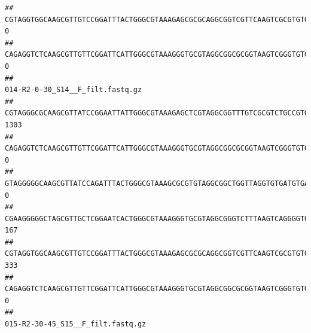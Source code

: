 \documentclass[]{article}
\begin{document}
\begin{verbatim}
## CGTAGGTGGCAAGCGTTGTCCGGATTTACTGGGCGTAAAGAGCGCGCAGGCGGTCGTTCAAGTCGCGTGTGAAAGCCCCCGGCTCAACTGGGGAGGGTCACGCGATACTGATCGACTCGAAGGCAGGAGAGGGTAGTGGAATTCCCGGTGTAGTGGTGAAATGCGTAGATATCGGGAGGAACACCAGTGGCGAAGGCGACTACCTGGCCTGTTCTTGACGCTGAGGCGCGAAAGCTAGGGGAGCAAACG                                 0
## CAGAGGTCTCAAGCGTTGTTCGGATTCATTGGGCGTAAAGGGTGCGTAGGCGGCGCGGTAAGTCGGGTGTGAAATCTCGGGGCTTAACTCCGAAACTGCATTCGATACTGCCGTGCTTGAGGACTGGAGAGGAGACTGGAATTTACGGTGTAGCGGTGAAATGCGTAGATATCGTAAGGAAGACCAGTGGCGAAGGCGGGTCTCTGGACAGTTCCTGACGCTGAGGCACGAAGGCCAGGGGAGCAAACG                                 0
##                                                                                                                                                                                                                                                           014-R2-0-30_S14__F_filt.fastq.gz
## CGTAGGGCGCAAGCGTTATCCGGAATTATTGGGCGTAAAGAGCTCGTAGGCGGTTTGTCGCGTCTGCCGTGAAAGTCCGGGGCTCAACTCCGGATCTGCGGTGGGTACGGGCAGACTAGAGTGATGTAGGGGAGACTGGAATTCCTGGTGTAGCGGTGAAATGCGCAGATATCAGGAGGAACACCGATGGCGAAGGCAGGTCTCTGGGCATTAACTGACGCTGAGGAGCGAAAGCATGGGGAGCGAACA                             1303
## CAGAGGTCTCAAGCGTTGTTCGGATTCATTGGGCGTAAAGGGTGCGTAGGCGGCGCGGTAAGTCGGGTGTGAAATCTCGGAGCTTAACTCCGAAACTGCATTCGATACTGCCGTGCTTGAGGACTGGAGAGGAGACTGGAATTTACGGTGTAGCGGTGAAATGCGTAGATATCGTAAGGAAGACCAGTGGCGAAGGCGGGTCTCTGGACAGTTCCTGACGCTGAGGCACGAAGGCCAGGGGAGCAAACG                                0
## GTAGGGGGCAAGCGTTATCCAGATTTACTGGGCGTAAAGCGCGTGTAGGCGGCTGGTTAGGTGTGATGTGAAATCTTCCGGCTCAACCGGAAAACTGCATTGCAAACCGGCCTGGCTAGAGTGCAGGAGAGGGAAGCGGAATTCCAGGTGTAGCGGTGAAATGCGTAGATATCTGGAGGAACACCAGTGGCGAAGGCGGCTTCCTGGCCTGCAACTGACGCTGAGACGCGAAAGCGTGGGGAGCGAAC                                 0
## CGAAGGGGGCTAGCGTTGCTCGGAATCACTGGGCGTAAAGGGTGCGTAGGCGGGTCTTTAAGTCAGGGGTGAAATCCTGGAGCTCAACTCCAGAACTGCCTTTGATACTGAAGATCTTGAGTTCGGGAGAGGTGAGTGGAACTGCGAGTGTAGAGGTGAAATTCGTAGATATTCGCAAGAACACCAGTGGCGAAGGCGGCTCACTGGCCCGATACTGACGCTGAGGCACGAAAGCGTGGGGAGCAAACA                              167
## CGTAGGTGGCAAGCGTTGTCCGGATTTACTGGGCGTAAAGAGCGCGCAGGCGGTCGTTCAAGTCGCGTGTGAAAGCCCCCGGCTCAACTGGGGAGGGTCACGCGATACTGATCGACTCGAAGGCAGGAGAGGGTAGTGGAATTCCCGGTGTAGTGGTGAAATGCGTAGATATCGGGAGGAACACCAGTGGCGAAGGCGACTACCTGGCCTGTTCTTGACGCTGAGGCGCGAAAGCTAGGGGAGCAAACG                              333
## CAGAGGTCTCAAGCGTTGTTCGGATTCATTGGGCGTAAAGGGTGCGTAGGCGGCGCGGTAAGTCGGGTGTGAAATCTCGGGGCTTAACTCCGAAACTGCATTCGATACTGCCGTGCTTGAGGACTGGAGAGGAGACTGGAATTTACGGTGTAGCGGTGAAATGCGTAGATATCGTAAGGAAGACCAGTGGCGAAGGCGGGTCTCTGGACAGTTCCTGACGCTGAGGCACGAAGGCCAGGGGAGCAAACG                                0
##                                                                                                                                                                                                                                                           015-R2-30-45_S15__F_filt.fastq.gz

\end{verbatim}
\end{document}
